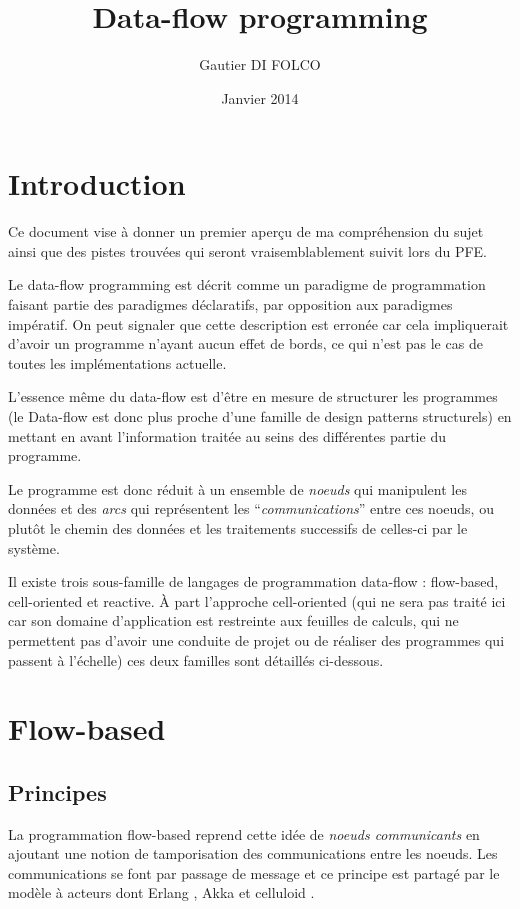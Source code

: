 \documentclass{article}
\title{Data-flow programming}
\author{Gautier DI FOLCO}
\date{Janvier 2014}
\begin{document}
\maketitle
\tableofcontents

\section{Introduction}\label{introduction}

Ce document vise à donner un premier aperçu de ma compréhension du sujet
ainsi que des pistes trouvées qui seront vraisemblablement suivit lors
du PFE.

Le data-flow programming est décrit \cite{dataflow} comme un paradigme de
programmation faisant partie des paradigmes déclaratifs, par opposition
aux paradigmes impératif. On peut signaler que cette description est
erronée car cela impliquerait d'avoir un programme n'ayant aucun effet
de bords, ce qui n'est pas le cas de toutes les implémentations
actuelle.

L'essence même du data-flow \cite{dataflow} est d'être en mesure de structurer
les programmes (le Data-flow est donc plus proche d'une famille de
design patterns structurels) en mettant en avant l'information traitée
au seins des différentes partie du programme.

Le programme est donc réduit à un ensemble de \emph{noeuds} qui
manipulent les données et des \emph{arcs} qui représentent les
``\emph{communications}'' entre ces noeuds, ou plutôt le chemin des
données et les traitements successifs de celles-ci par le système.

Il existe trois sous-famille de langages de programmation data-flow :
flow-based, cell-oriented et reactive. À part l'approche cell-oriented
(qui ne sera pas traité ici car son domaine d'application est restreinte
aux feuilles de calculs, qui ne permettent pas d'avoir une conduite de
projet ou de réaliser des programmes qui passent à l'échelle) ces deux
familles sont détaillés ci-dessous.

\section{Flow-based}\label{flow-based}

\subsection{Principes}\label{principes}

La programmation flow-based reprend cette idée de \emph{noeuds
communicants} en ajoutant une notion de tamporisation des communications
entre les noeuds. Les communications se font par passage de message et
ce principe est partagé par le modèle à acteurs \cite{actors} dont Erlang
\cite{erlang}, Akka \cite{akka} et celluloid \cite{celluloid}.
\end{document}
